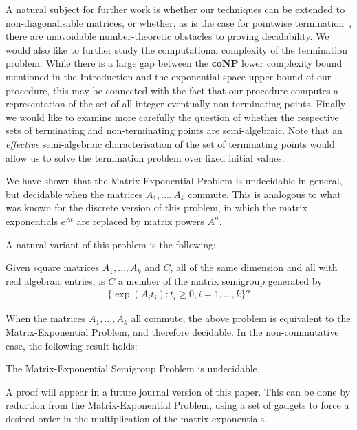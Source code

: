 A natural subject for further work is whether our techniques can be
extended to non-diagonalisable matrices, or whether, as is the case
for pointwise termination~\cite{OW14:SODA}, there are unavoidable
number-theoretic obstacles to proving decidability.  We would also like
to further study the computational complexity of the termination
problem.  While there is a large gap between the \textbf{coNP} lower
complexity bound mentioned in the Introduction and the exponential
space upper bound of our procedure, this may be connected with the
fact that our procedure computes a representation of the set of all
integer eventually non-terminating points. Finally we would like to
examine more carefully the question of whether the respective sets of
terminating and non-terminating points are semi-algebraic.  Note that
an \emph{effective} semi-algebraic characterisation of the set of
terminating points would allow us to solve the termination problem
over fixed initial values.





We have shown that the Matrix-Exponential Problem is undecidable in
general, but decidable when the matrices $A_{1}, \ldots, A_{k}$ commute.
This is analogous to what was known for the discrete version
of this problem, in which the matrix exponentials $e^{At}$ are
replaced by matrix powers $A^n$.

A natural variant of this problem is the following:
\begin{definition}
  Given square matrices $A_{1}, \ldots, A_{k}$ and $C$, all of the
  same dimension and all with real algebraic entries, is $C$ a member
  of the matrix semigroup generated by
\begin{align*}
\lbrace \exp(A_{i} t_{i}) : t_{i} \geq 0 , i=1,\ldots,k \rbrace ?
\end{align*}
\end{definition}
When the matrices $A_1,\ldots,A_k$ all commute, the above problem is
equivalent to the Matrix-Exponential Problem, and therefore decidable. In the non-commutative case, the following result holds:
\begin{theorem}
The Matrix-Exponential Semigroup Problem is undecidable.
\end{theorem}
A proof will appear in a future journal version of this paper. This can be done by reduction from the Matrix-Exponential Problem, using a set of gadgets to force a desired order in the multiplication of the matrix exponentials.

